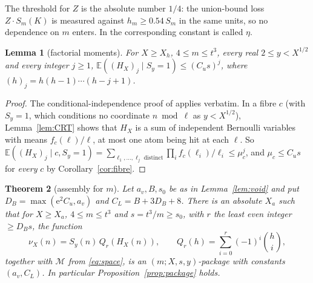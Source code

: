 \documentclass[10pt,reqno]{amsart}
\newtheorem{theorem}{Theorem}[section]
\newtheorem{lemma}[theorem]{Lemma}
\theoremstyle{definition}
\newcommand{\M}{\mathcal M}
\newcommand{\E}{\mathbb E}
\newcommand{\e}{\mathrm e}
\begin{document}
The threshold for $Z$ is the absolute number $1/4$: the union-bound loss
$Z\cdot S_m(K)$ is measured against $h_m\geq0.54\,S_m$ in the same units,
so no dependence on $m$ enters.  In \cite{TQ} the corresponding constant
is called $\eta$.

\begin{lemma}[factorial moments]\label{lem:moments}
For $X\geq X_h$, $4\leq m\leq t^3$, every real $2\leq y<X^{1/2}$ and every
integer $j\geq1$,
$\E((H_X)_j\mid S_y=1)\leq(C_us)^j$, where
$(h)_j=h(h-1)\cdots(h-j+1)$.
\end{lemma}

\begin{proof}
The conditional-independence proof of \cite[Theorem~6.3]{TQ} applies
verbatim.  In a fibre $c$ (with $S_y=1$, which conditions no coordinate
$n\bmod\ell$ as $y<X^{1/2}$), Lemma~\ref{lem:CRT} shows that $H_X$ is a
sum of independent Bernoulli variables with means $f_c(\ell)/\ell$, at
most one atom being hit at each $\ell$.  So
$\E((H_X)_j\mid c,S_y=1)=\sum_{\ell_1,\ldots,\ell_j\text{ distinct}}\prod_i f_c(\ell_i)/\ell_i\leq\mu_c^j$,
and $\mu_c\leq C_us$ for \emph{every} $c$ by Corollary~\ref{cor:fibre}.
\end{proof}

\begin{theorem}[assembly for $m$]\label{thm:assembly}
Let $a_v,B,s_0$ be as in Lemma~\ref{lem:void} and put
$D_B=\max(\e^2C_u,a_v)$ and $C_L=B+3D_B+8$.  There is an absolute
$X_a$ such that for $X\geq X_a$, $4\leq m\leq t^3$ and $s=t^3/m\geq s_0$,
with $r$ the least even integer $\geq D_Bs$, the function
\[
 \nu_X(n)=S_y(n)\,Q_r(H_X(n)),\qquad
 Q_r(h)=\sum_{i=0}^r(-1)^i\binom hi,
\]
together with $\M$ from \eqref{eq:space}, is an $(m;X,s,y)$-package with
constants $(a_v,C_L)$.  In particular Proposition~\ref{prop:package}
holds.
\end{theorem}
\end{document}
